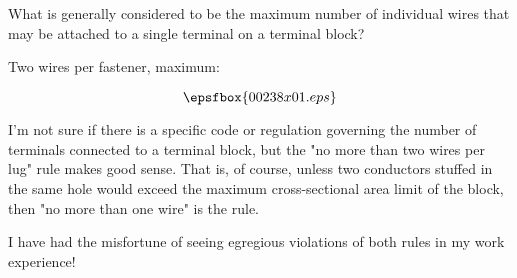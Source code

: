 

What is generally considered to be the maximum number of individual wires that may be attached to a single terminal on a terminal block?







Two wires per fastener, maximum: 

$$\epsfbox{00238x01.eps}$$







I'm not sure if there is a specific code or regulation governing the number of terminals connected to a terminal block, but the "no more than two wires per lug" rule makes good sense.  That is, of course, unless two conductors stuffed in the same hole would exceed the maximum cross-sectional area limit of the block, then "no more than one wire" is the rule.

I have had the misfortune of seeing egregious violations of both rules in my work experience!




